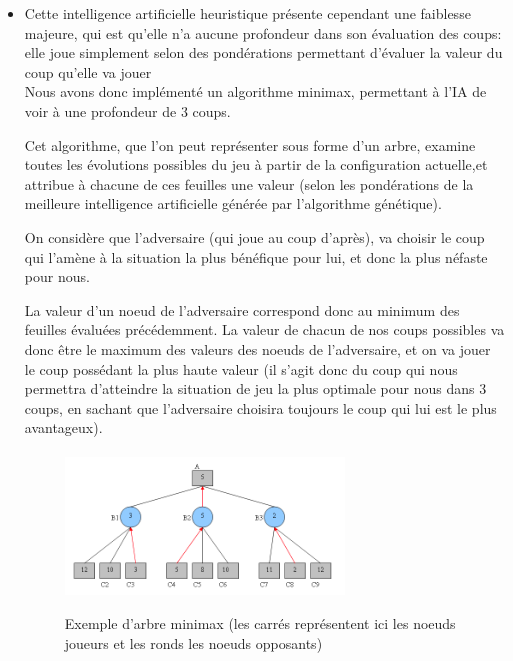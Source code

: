 \documentclass[10pt, french]{article}
\begin{document}
\begin{itemize}
\paragraph{}
\item Cette intelligence artificielle heuristique présente cependant une faiblesse majeure, qui est qu'elle n'a aucune profondeur dans son évaluation des coups: elle joue simplement selon des pondérations permettant d'évaluer la valeur du coup qu'elle va jouer \\
Nous avons donc implémenté un algorithme minimax, permettant à l'IA de voir à une profondeur de 3 coups. \\
\par Cet algorithme, que l'on peut représenter sous forme d'un arbre, examine toutes les évolutions possibles du jeu à partir de la configuration actuelle,et attribue à chacune de ces feuilles une valeur (selon les pondérations de la meilleure intelligence artificielle générée par l'algorithme génétique). \\
\par On considère que l'adversaire (qui joue au coup d'après), va choisir le coup qui l'amène à la situation la plus bénéfique pour lui, et donc la plus néfaste pour nous. \\
\par La valeur d'un noeud de l'adversaire correspond donc au minimum des feuilles évaluées précédemment. La valeur de chacun de nos coups possibles va donc être le maximum des valeurs des noeuds de l'adversaire, et on va jouer le coup possédant la plus haute valeur (il s'agit donc du coup qui nous permettra d'atteindre la situation de jeu la plus optimale pour nous dans 3 coups, en sachant que l'adversaire choisira toujours le coup qui lui est le plus avantageux).

\paragraph{}
\begin{figure}[h!]
\centering
\includegraphics[width=0.7\textwidth]{minimax.png}
\caption{ }{Exemple d'arbre minimax (les carrés représentent ici les noeuds joueurs et les ronds les noeuds opposants)}
\end{figure}



\end{itemize}
\end{document}
